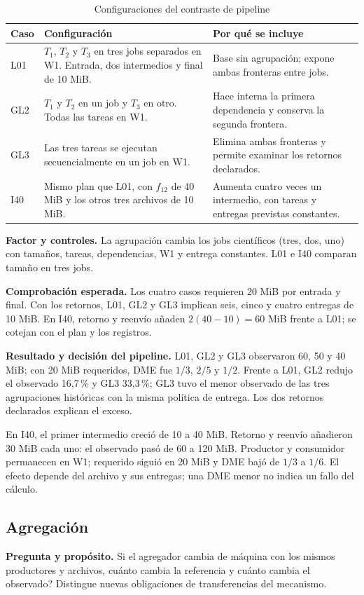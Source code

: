 \begin{table}[htbp]\centering\small
\caption{Configuraciones del contraste de pipeline}
\begin{tabularx}{\linewidth}{@{}P{1.35cm}YY@{}}
\toprule Caso & Configuración & Por qué se incluye\\\midrule
L01 & $T_1$, $T_2$ y $T_3$ en tres jobs separados en W1. Entrada, dos intermedios y final de 10 MiB. & Base sin agrupación; expone ambas fronteras entre jobs.\\
GL2 & $T_1$ y $T_2$ en un job y $T_3$ en otro. Todas las tareas en W1. & Hace interna la primera dependencia y conserva la segunda frontera.\\
GL3 & Las tres tareas se ejecutan secuencialmente en un job en W1. & Elimina ambas fronteras y permite examinar los retornos declarados.\\
I40 & Mismo plan que L01, con $f_{12}$ de 40 MiB y los otros tres archivos de 10 MiB. & Aumenta cuatro veces un intermedio, con tareas y entregas previstas constantes.\\
\bottomrule
\end{tabularx}
\end{table}

\textbf{Factor y controles.} La agrupación cambia los jobs científicos (tres, dos, uno) con tamaños, tareas, dependencias, W1 y entrega constantes. L01 e I40 comparan tamaño en tres jobs.

\textbf{Comprobación esperada.} Los cuatro casos requieren 20 MiB por entrada y final. Con los retornos, L01, GL2 y GL3 implican seis, cinco y cuatro entregas de 10 MiB. En I40, retorno y reenvío añaden $2(40-10)=60$ MiB frente a L01; se cotejan con el plan y los registros.


\noindent\textbf{Resultado y decisión del pipeline.} L01, GL2 y GL3 observaron 60, 50 y 40 MiB; con 20 MiB requeridos, DME fue $1/3$, $2/5$ y $1/2$. Frente a L01, GL2 redujo el observado 16,7\,\% y GL3 33,3\,\%; GL3 tuvo el menor observado de las tres agrupaciones históricas con la misma política de entrega. Los dos retornos declarados explican el exceso.

En I40, el primer intermedio creció de 10 a 40 MiB. Retorno y reenvío añadieron 30 MiB cada uno: el observado pasó de 60 a 120 MiB. Productor y consumidor permanecen en W1; requerido siguió en 20 MiB y DME bajó de $1/3$ a $1/6$. El efecto depende del archivo y sus entregas; una DME menor no indica un fallo del cálculo.

\subsection{Agregación}
\label{sec:prueba_a}
\textbf{Pregunta y propósito.} Si el agregador cambia de máquina con los mismos productores y archivos, \textquestiondown{}cuánto cambia la referencia y cuánto cambia el observado? Distingue nuevas obligaciones de transferencias del mecanismo.

